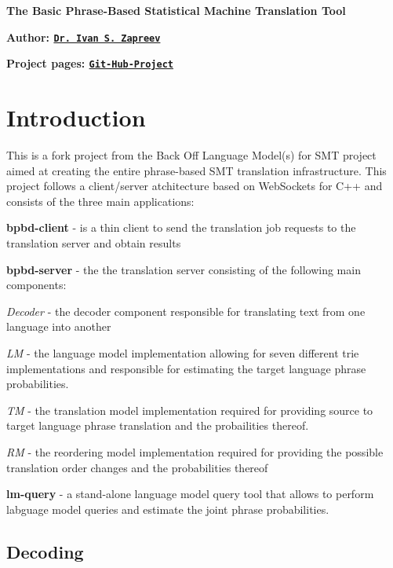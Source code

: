 {\bfseries The Basic Phrase-\/\+Based Statistical Machine Translation Tool}

{\bfseries Author\+: \href{https://nl.linkedin.com/in/zapreevis}{\tt Dr. Ivan S. Zapreev}}

{\bfseries Project pages\+: \href{https://github.com/ivan-zapreev/Back-Off-Language-Model-SMT}{\tt Git-\/\+Hub-\/\+Project}}

\section*{Introduction}

This is a fork project from the Back Off Language Model(s) for S\+M\+T project aimed at creating the entire phrase-\/based S\+M\+T translation infrastructure. This project follows a client/server atchitecture based on Web\+Sockets for C++ and consists of the three main applications\+:


\begin{DoxyItemize}
\item {\bfseries bpbd-\/client} -\/ is a thin client to send the translation job requests to the translation server and obtain results
\item {\bfseries bpbd-\/server} -\/ the the translation server consisting of the following main components\+:
\begin{DoxyItemize}
\item {\itshape Decoder} -\/ the decoder component responsible for translating text from one language into another
\item {\itshape L\+M} -\/ the language model implementation allowing for seven different trie implementations and responsible for estimating the target language phrase probabilities.
\item {\itshape T\+M} -\/ the translation model implementation required for providing source to target language phrase translation and the probailities thereof.
\item {\itshape R\+M} -\/ the reordering model implementation required for providing the possible translation order changes and the probabilities thereof
\end{DoxyItemize}
\item {\bfseries lm-\/query} -\/ a stand-\/alone language model query tool that allows to perform labguage model queries and estimate the joint phrase probabilities.
\end{DoxyItemize}

\subsection*{Decoding}

